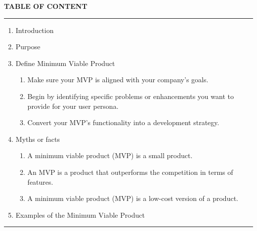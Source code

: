 \documentclass[paper=a4, fontsize=11pt]{scrartcl}
\numberwithin{equation}{section}		%
\numberwithin{figure}{section}			%
\numberwithin{table}{section}				%
\begin{document}
\newpage
\textbf{TABLE OF CONTENT}\\
\rule{\textwidth}{1pt}
\begin{enumerate}
    \item Introduction
    \item Purpose
    \item Define Minimum Viable Product
    \begin{enumerate}
        \item Make sure your MVP is aligned with your company's goals.
        \item Begin by identifying specific problems or enhancements you want to provide for your user persona.
        \item Convert your MVP's functionality into a development strategy.
    \end{enumerate}
    \item Myths or facts
    \begin{enumerate}
        \item A minimum viable product (MVP) is a small product.
        \item An MVP is a product that outperforms the competition in terms of features.
        \item A minimum viable product (MVP) is a low-cost version of a product.
    \end{enumerate}
    \item  Examples of the Minimum Viable Product
\end{enumerate}
\rule{\textwidth}{1pt}
\newpage
\Large
\end{document}
